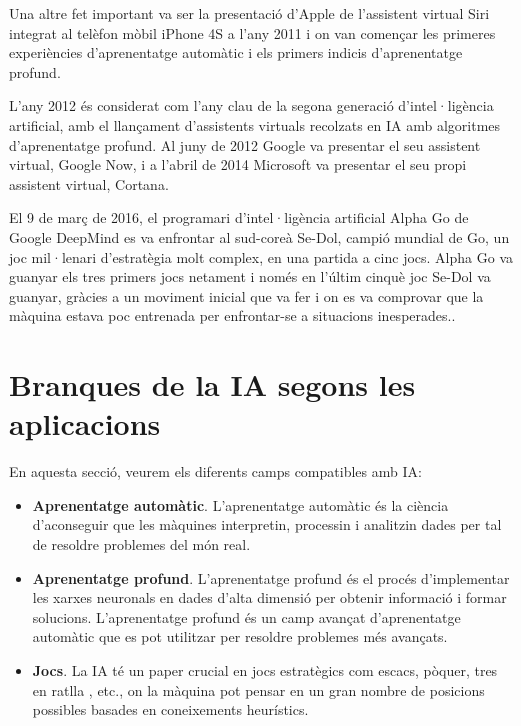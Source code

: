 \begin{refsection}
	Una altre fet important va ser la presentació d'Apple de l'assistent virtual Siri integrat al telèfon mòbil iPhone 4S a l'any 2011 i on van començar les primeres experiències d'aprenentatge automàtic i els primers indicis d'aprenentatge profund.\supercite{NationalGeographic}
	
	L'any 2012 és considerat com l'any clau de la segona generació d'intel·ligència artificial, amb el llançament d'assistents virtuals recolzats en IA amb algoritmes d'aprenentatge profund. Al juny de 2012 Google va presentar el seu assistent virtual, Google Now, i a l'abril de 2014 Microsoft va presentar el seu propi assistent virtual, Cortana.\supercite{aiwiki}
	
	El 9 de març de 2016, el programari d'intel·ligència artificial Alpha Go de Google DeepMind es va enfrontar al sud-coreà Se-Dol, campió mundial de Go, un joc mil·lenari d'estratègia molt complex, en una partida a cinc jocs. Alpha Go va guanyar els tres primers jocs netament i només en l'últim cinquè joc Se-Dol va guanyar, gràcies a un moviment inicial que va fer i on es va comprovar que la màquina estava poc entrenada per enfrontar-se a situacions inesperades.\supercite{Breuhist}.
	
	\section{Branques de la IA segons les aplicacions}
	En aquesta secció, veurem els diferents camps compatibles amb IA:\supercite{aitutor, aiwiki, edureka}

	\begin{itemize}
		\item \textbf{Aprenentatge automàtic}. L'aprenentatge automàtic és la ciència d'aconseguir que les màquines interpretin, processin i analitzin dades per tal de resoldre problemes del món real.
		
		\item \textbf{Aprenentatge profund}. L’aprenentatge profund és el procés d'implementar les xarxes neuronals en dades d'alta dimensió per obtenir informació i formar solucions. L'aprenentatge profund és un camp avançat d'aprenentatge automàtic que es pot utilitzar per resoldre problemes més avançats.
		
		\item \textbf{Jocs}. La IA té un paper crucial en jocs estratègics com escacs, pòquer, tres en ratlla , etc., on la màquina pot pensar en un gran nombre de posicions possibles basades en coneixements heurístics.
		

\end{itemize}
\end{refsection}
